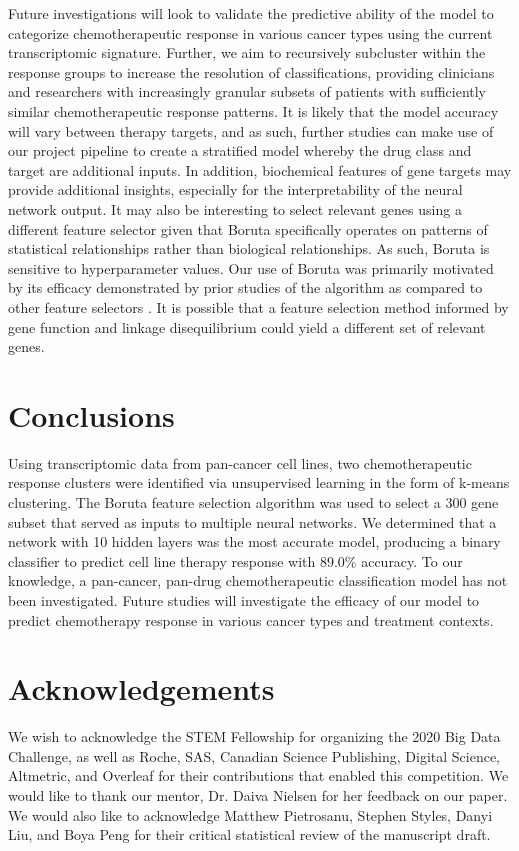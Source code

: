 \documentclass[10pt, letterpaper, twocolumn]{article}
\begin{document}
Future investigations will look to validate the predictive ability of the model to categorize chemotherapeutic response in various cancer types using the current transcriptomic signature. Further, we aim to recursively subcluster within the response groups to increase the resolution of classifications, providing clinicians and researchers with increasingly granular subsets of patients with sufficiently similar chemotherapeutic response patterns. It is likely that the model accuracy will vary between therapy targets, and as such, further studies can make use of our project pipeline to create a stratified model whereby the drug class and target are additional inputs. In addition, biochemical features of gene targets may provide additional insights, especially for the interpretability of the neural network output. It may also be interesting to select relevant genes using a different feature selector given that Boruta specifically operates on patterns of statistical relationships rather than biological relationships. As such, Boruta is sensitive to hyperparameter values. Our use of Boruta was primarily motivated by its efficacy demonstrated by prior studies of the algorithm as compared to other feature selectors \cite{boruta, deep_cell}. It is possible that a feature selection method informed by gene function and linkage disequilibrium could yield a different set of relevant genes.


\section{Conclusions}
Using transcriptomic data from pan-cancer cell lines, two chemotherapeutic response clusters were identified via unsupervised learning in the form of k-means clustering. The Boruta feature selection algorithm was used to select a 300 gene subset that served as inputs to multiple neural networks. We determined that a network with 10 hidden layers was the most accurate model, producing a binary classifier to predict cell line therapy response with 89.0\% accuracy. To our knowledge, a pan-cancer, pan-drug chemotherapeutic classification model has not been investigated. Future studies will investigate the efficacy of our model to predict chemotherapy response in various cancer types and treatment contexts.


\section*{Acknowledgements}
We wish to acknowledge the STEM Fellowship for organizing the 2020 Big Data Challenge, as well as Roche, SAS, Canadian Science Publishing, Digital Science, Altmetric, and Overleaf for their contributions that enabled this competition. We would like to thank our mentor, Dr. Daiva Nielsen for her feedback on our paper. We would also like to acknowledge Matthew Pietrosanu, Stephen Styles, Danyi Liu, and Boya Peng for their critical statistical review of the manuscript draft.
\end{document}
